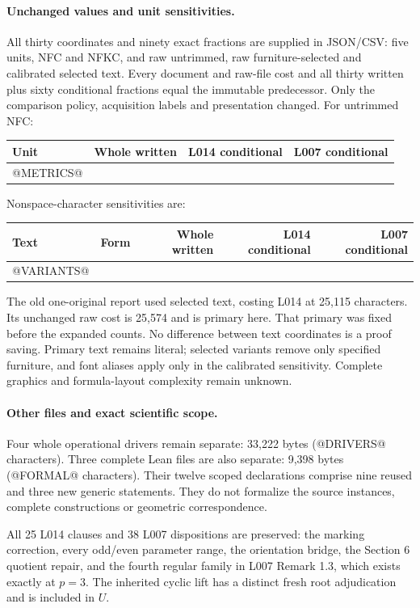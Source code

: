\documentclass[11pt,a4paper]{article}
\begin{document}
\paragraph{Unchanged values and unit sensitivities.}
All thirty coordinates and ninety exact fractions are supplied in JSON/CSV:
five units, NFC and NFKC, and raw untrimmed, raw furniture-selected and
calibrated selected text. Every document and raw-file cost and all thirty
written plus sixty conditional fractions equal the immutable predecessor.
Only the comparison policy, acquisition labels and presentation changed.
For untrimmed NFC:
\begin{center}\small\begin{tabular}{lrrr}\toprule
Unit&Whole written&L014 conditional&L007 conditional\\\midrule
@METRICS@
\bottomrule\end{tabular}\end{center}
Nonspace-character sensitivities are:
\begin{center}\small\begin{tabular}{llrrr}\toprule
Text&Form&Whole written&L014 conditional&L007 conditional\\\midrule
@VARIANTS@
\bottomrule\end{tabular}\end{center}
The old one-original report used selected text, costing L014 at 25,115
characters. Its unchanged raw cost is 25,574 and is primary here. That
primary was fixed before the expanded counts. No difference between text
coordinates is a proof saving. Primary text remains literal; selected variants
remove only specified furniture, and font aliases apply only in the calibrated
sensitivity. Complete graphics and formula-layout complexity remain unknown.

\paragraph{Other files and exact scientific scope.}
Four whole operational drivers remain separate: 33,222 bytes (@DRIVERS@
characters). Three complete Lean files are also separate: 9,398 bytes
(@FORMAL@ characters). Their twelve scoped declarations comprise nine reused
and three new generic statements. They do not formalize the source instances,
complete constructions or geometric correspondence.

All 25 L014 clauses and 38 L007 dispositions are preserved: the marking
correction, every odd/even parameter range, the orientation bridge, the
Section 6 quotient repair, and the fourth regular family in L007 Remark 1.3,
which exists exactly at $p=3$. The inherited cyclic lift has a distinct fresh
root adjudication and is included in $U$.
\end{document}
